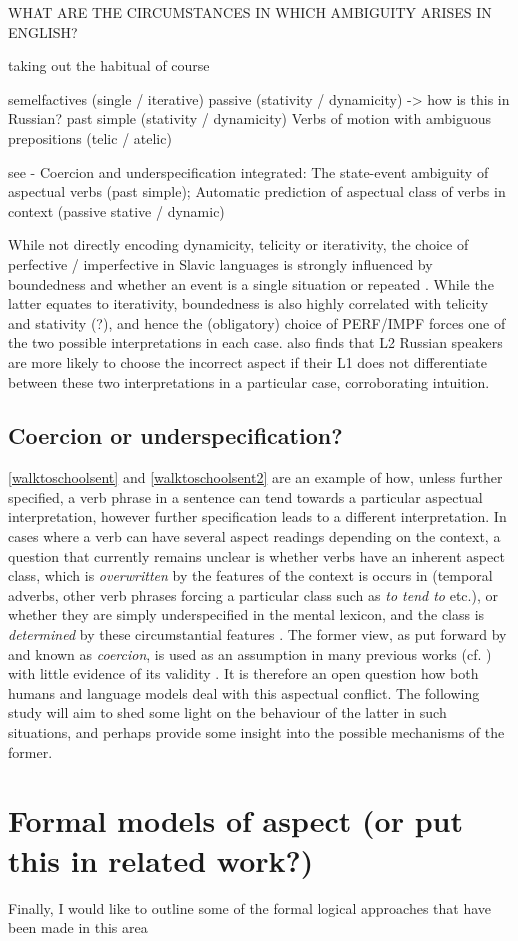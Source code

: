 \subtitle{Contexts frequently triggering aspectual ambiguity in English}
WHAT ARE THE CIRCUMSTANCES IN WHICH AMBIGUITY ARISES IN ENGLISH?

taking out the habitual of course

semelfactives (single / iterative)
passive (stativity / dynamicity) -> how is this in Russian?
past simple (stativity / dynamicity)
Verbs of motion with ambiguous prepositions (telic / atelic)

see - Coercion and underspecification integrated: The state-event ambiguity of aspectual verbs (past simple); Automatic prediction of aspectual class of verbs in context (passive stative / dynamic)

While not directly encoding dynamicity, telicity or iterativity, the choice of perfective / imperfective in Slavic languages is strongly influenced by boundedness and whether an event is a single situation or repeated \citep{wiemer2017}. While the latter equates to iterativity, boundedness is also highly correlated with telicity and stativity (?), and hence the (obligatory) choice of PERF/IMPF forces one of the two possible interpretations in each case. \citet{errors_in_russian_aspect_apresyan} also finds that L2 Russian speakers are more likely to choose the incorrect aspect if their L1 does not differentiate between these two interpretations in a particular case, corroborating intuition.

\subsection{Coercion or underspecification?}
\ref{walktoschoolsent} and \ref{walktoschoolsent2} are an example of how, unless further specified, a verb phrase in a sentence can tend towards a particular aspectual interpretation, however further specification leads to a different interpretation. In cases where a verb can have several aspect readings depending on the context, a question that currently remains unclear is whether verbs have an inherent aspect class, which is \emph{overwritten} by the features of the context is occurs in (temporal adverbs, other verb phrases forcing a particular class such as \emph{to tend to} etc.), or whether they are simply underspecified in the mental lexicon, and the class is \emph{determined} by these circumstantial features \citep{https://doi.org/10.11588/huplc.2017.0.37820}. The former view, as put forward by \citet{moens-steedman-1988-temporal} and known as \emph{coercion}, is used as an assumption in many previous works (cf. \citet{Swart+2019+321+349}) with little evidence of its validity \citep{https://doi.org/10.11588/huplc.2017.0.37820}. It is therefore an open question how both humans and language models deal with this aspectual conflict. The following study will aim to shed some light on the behaviour of the latter in such situations, and perhaps provide some insight into the possible mechanisms of the former.

\section{Formal models of aspect (or put this in related work?)}
Finally, I would like to outline some of the formal logical approaches that have been made in this area